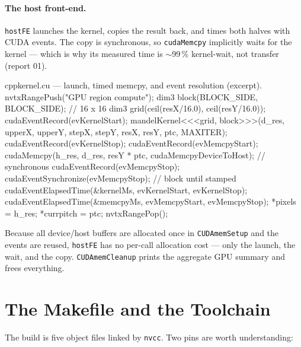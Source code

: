 \documentclass[
	english,
	letterpaper, oneside
]{article}
\begin{document}
\paragraph{The host front-end.} \texttt{hostFE} launches the kernel, copies the
result back, and times both halves with CUDA events. The copy is synchronous, so
\texttt{cudaMemcpy} implicitly waits for the kernel --- which is why its measured
time is $\sim$99\,\% kernel-wait, not transfer (report 01).

\begin{sourcecode}{cpp}{kernel.cu --- launch, timed memcpy, and event resolution (excerpt).}
nvtxRangePush("GPU region compute");
dim3 block(BLOCK_SIDE, BLOCK_SIDE);                       // 16 x 16
dim3 grid(ceil(resX/16.0), ceil(resY/16.0));
cudaEventRecord(evKernelStart);
mandelKernel<<<grid, block>>>(d_res, upperX, upperY, stepX, stepY,
                              resX, resY, ptc, MAXITER);
cudaEventRecord(evKernelStop);
cudaEventRecord(evMemcpyStart);
cudaMemcpy(h_res, d_res, resY * ptc, cudaMemcpyDeviceToHost);  // synchronous
cudaEventRecord(evMemcpyStop);
cudaEventSynchronize(evMemcpyStop);                      // block until stamped
cudaEventElapsedTime(&kernelMs, evKernelStart, evKernelStop);
cudaEventElapsedTime(&memcpyMs, evMemcpyStart, evMemcpyStop);
*pixels = h_res;  *currpitch = ptc;
nvtxRangePop();
\end{sourcecode}

Because all device/host buffers are allocated once in \texttt{CUDAmemSetup} and the
events are reused, \texttt{hostFE} has no per-call allocation cost --- only the
launch, the wait, and the copy. \texttt{CUDAmemCleanup} prints the aggregate GPU
summary and frees everything.

\section{The Makefile and the Toolchain}

The build is five object files linked by \texttt{nvcc}. Two pins are worth
understanding:

\end{document}
